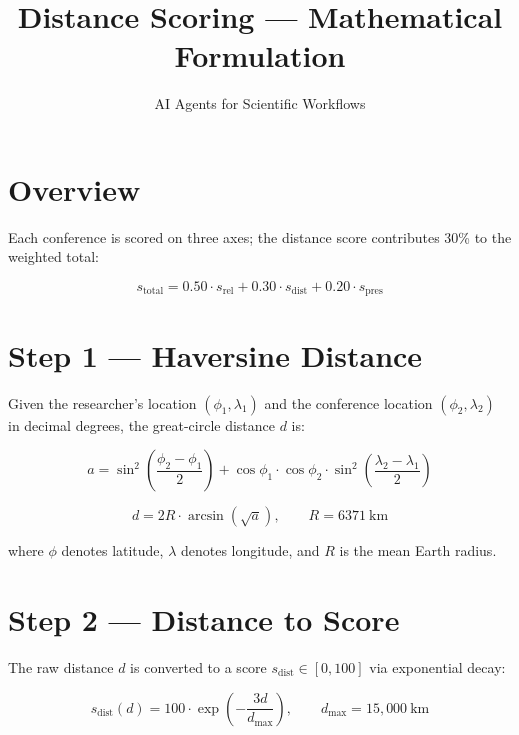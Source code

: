 \documentclass[11pt, a4paper]{article}
\title{\textbf{Distance Scoring — Mathematical Formulation}}
\author{AI Agents for Scientific Workflows}
\date{}
\begin{document}
\maketitle
\thispagestyle{empty}

\section*{Overview}

Each conference is scored on three axes; the distance score contributes 30\% to the
weighted total:

\begin{equation}
    s_{\text{total}} = 0.50 \cdot s_{\text{rel}} + 0.30 \cdot s_{\text{dist}} + 0.20 \cdot s_{\text{pres}}
\end{equation}

\section*{Step 1 — Haversine Distance}

Given the researcher's location $(\phi_1, \lambda_1)$ and the conference location
$(\phi_2, \lambda_2)$ in decimal degrees, the great-circle distance $d$ is:

\begin{equation}
    a = \sin^2\!\left(\frac{\phi_2 - \phi_1}{2}\right)
        + \cos\phi_1 \cdot \cos\phi_2 \cdot
          \sin^2\!\left(\frac{\lambda_2 - \lambda_1}{2}\right)
\end{equation}

\begin{equation}
    d = 2R \cdot \arcsin\!\left(\sqrt{a}\right), \qquad R = 6371\ \text{km}
\end{equation}

where $\phi$ denotes latitude, $\lambda$ denotes longitude, and $R$ is the mean
Earth radius.

\section*{Step 2 — Distance to Score}

The raw distance $d$ is converted to a score $s_{\text{dist}} \in [0, 100]$ via
exponential decay:

\begin{equation}
    s_{\text{dist}}(d) = 100 \cdot \exp\!\left(-\frac{3d}{d_{\max}}\right),
    \qquad d_{\max} = 15{,}000\ \text{km}
\end{equation}
\end{document}
